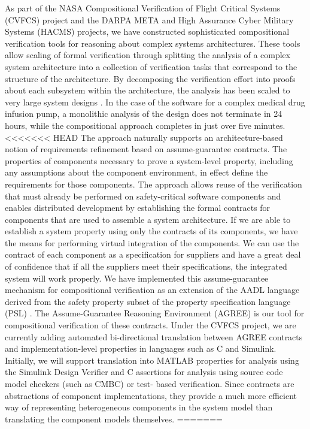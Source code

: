 As part of the NASA Compositional Verification of Flight Critical Systems (CVFCS) project and the DARPA META and High Assurance Cyber Military Systems (HACMS) projects, we have constructed sophisticated compositional verification tools for reasoning about complex systems architectures. These tools \cite{NFM2012:CoGaMiWhLaLu} allow scaling of formal verification through splitting the analysis of a complex system architecture into a collection of verification tasks that correspond to the structure of the architecture. By decomposing the verification effort into proofs about each subsystem within the architecture, the analysis has been scaled to very large system designs \cite{QFCS15:backes}. In the case of the software for a complex medical drug infusion pump, a monolithic analysis of the design does not terminate in 24 hours, while the compositional approach completes in just over five minutes.
<<<<<<< HEAD
The approach naturally supports an architecture-based notion of requirements refinement based on assume-guarantee contracts. The properties of components necessary to prove a system-level property, including any assumptions about the component environment, in effect define the requirements for those components. The approach allows reuse of the verification that must already be performed on safety-critical software components and enables distributed development by establishing the formal contracts for components that are used to assemble a system architecture. If we are able to establish a system property using only the contracts of its components, we have the means for performing virtual integration of the components. We can use the contract of each component as a specification for suppliers and have a great deal of confidence that if all the suppliers meet their specifications, the integrated system will work properly.
We have implemented this assume-guarantee mechanism for compositional verification as an extension of the AADL language derived from the safety property subset of the property specification language (PSL) \cite{IEEE:PSL}. The Assume-Guarantee Reasoning Environment (AGREE) is our tool for compositional verification of these contracts. Under the CVFCS project, we are currently adding automated bi-directional translation between AGREE contracts and implementation-level properties in languages such as C and Simulink. Initially, we will support translation into MATLAB properties for analysis using the Simulink Design Verifier and C assertions for analysis using source code model checkers (such as CMBC) or test- based verification. Since contracts are abstractions of component implementations, they provide a much more efficient way of representing heterogeneous components in the system model than translating the component models themselves.
=======

